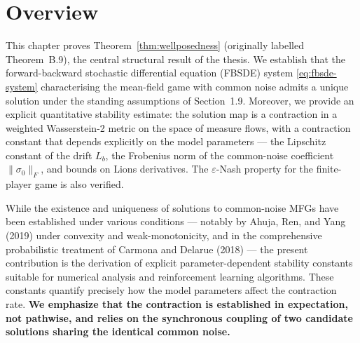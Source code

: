 %

\section{Overview}

This chapter proves Theorem~\ref{thm:wellposedness} (originally labelled Theorem~B.9),
the central structural result of the thesis. We establish that the forward-backward
stochastic differential equation (FBSDE) system \eqref{eq:fbsde-system} characterising
the mean-field game with common noise admits a unique solution under the standing
assumptions of Section~1.9. Moreover, we provide an explicit quantitative stability
estimate: the solution map is a contraction in a weighted Wasserstein-2 metric on the
space of measure flows, with a contraction constant that depends explicitly on the
model parameters --- the Lipschitz constant of the drift $L_b$, the Frobenius norm of
the common-noise coefficient $\|\sigma_0\|_F$, and bounds on Lions derivatives. The
$\varepsilon$-Nash property for the finite-player game is also verified.

While the existence and uniqueness of solutions to common-noise MFGs have been
established under various conditions --- notably by Ahuja, Ren, and Yang (2019) under
convexity and weak-monotonicity, and in the comprehensive probabilistic treatment of
Carmona and Delarue (2018) --- the present contribution is the derivation of explicit
parameter-dependent stability constants suitable for numerical analysis and
reinforcement learning algorithms. These constants quantify precisely how the model
parameters affect the contraction rate. \textbf{We emphasize that the contraction is
established in expectation, not pathwise, and relies on the synchronous coupling of two
candidate solutions sharing the identical common noise.}

